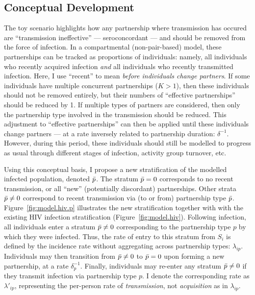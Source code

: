 \subsection{Conceptual Development}\label{foi.prop.concept}
The toy scenario highlights how any partnership where transmission has occured
are ``transmission ineffective'' --- \ie seroconcordant ---
and should be removed from the force of infection.
In a compartmental (non-pair-based) model,
these partnerships can be tracked as proportions of individuals: namely,
all individuals who recently acquired infection \emph{and}
all individuals who recently transmitted infection.
Here, I use ``recent'' to mean \emph{before individuals change partners}.
If some individuals have multiple concurrent partnerships ($K > 1$),
then these individuals should not be removed entirely,
but their numbers of ``effective partnerships'' should be reduced by 1.
If multiple types of partners are considered,
then only the partnership type involved in the transmission should be reduced.
This adjustment to ``effective partnerships'' can then be applied
until these individuals change partners
--- at a rate inversely related to partnership duration: $\delta^{-1}$.
However, during this period, these individuals should still be modelled
to progress as usual through different stages of infection, activity group turnover, etc.
\par
Using this conceptual basis,
I propose a new stratification of the modelled infected population, denoted $\bar{p}$.
The stratum $\bar{p} = 0$ corresponds to no recent transmission,
or all ``new'' (potentially discordant) partnerships.
Other strata $\bar{p} \ne 0$ correspond to recent transmission via (to or from) partnership type $\bar{p}$.
Figure~\ref{fig:model.hiv.p} illustrates the new stratification
together with with the existing HIV infection stratification (Figure~\ref{fig:model.hiv}).
Following infection, all individuals enter a stratum $\bar{p} \ne 0$
corresponding to the partnership type $p$ by which they were infected.
Thus, the rate of entry to this stratum from $S_i$ is defined by
the incidence rate without aggregating across partnership types: $\lambda_{ip}$.
Individuals may then transition from $\bar{p} \ne 0$ to $\bar{p} = 0$
upon forming a new partnership, at a rate $\delta_p^{-1}$.
Finally, individuals may re-enter any stratum $\bar{p} \ne 0$
if they transmit infection via partnership type $p$.
I denote the corresponding rate as $\lambda'_{ip}$,
representing the per-person rate of \emph{transmission},
not \emph{acquisition} as in $\lambda_{ip}$.
